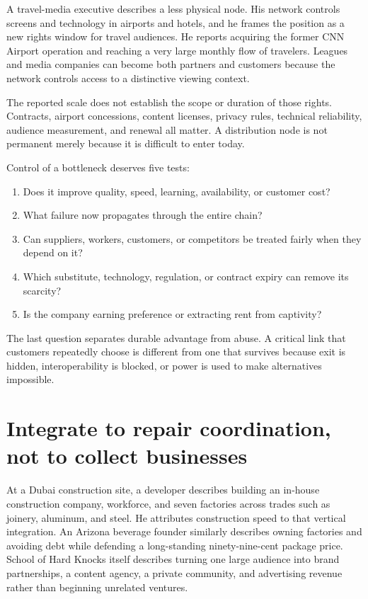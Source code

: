 A travel-media executive describes a less physical node. His network controls
screens and technology in airports and hotels, and he frames the position as a
new rights window for travel audiences. He reports acquiring the former CNN
Airport operation and reaching a very large monthly flow of travelers. Leagues
and media companies can become both partners and customers because the network
controls access to a distinctive viewing context.

The reported scale does not establish the scope or duration of those rights.
Contracts, airport concessions, content licenses, privacy rules, technical
reliability, audience measurement, and renewal all matter. A distribution node
is not permanent merely because it is difficult to enter today.

Control of a bottleneck deserves five tests:

\begin{enumerate}[itemsep=0.15em]
\item Does it improve quality, speed, learning, availability, or customer cost?
\item What failure now propagates through the entire chain?
\item Can suppliers, workers, customers, or competitors be treated fairly when
  they depend on it?
\item Which substitute, technology, regulation, or contract expiry can remove
  its scarcity?
\item Is the company earning preference or extracting rent from captivity?
\end{enumerate}

The last question separates durable advantage from abuse. A critical link that
customers repeatedly choose is different from one that survives because exit
is hidden, interoperability is blocked, or power is used to make alternatives
impossible.

\section{Integrate to repair coordination, not to collect businesses}

At a Dubai construction site, a developer describes building an in-house
construction company, workforce, and seven factories across trades such as
joinery, aluminum, and steel. He attributes construction speed to that vertical
integration. An Arizona beverage founder similarly describes owning factories
and avoiding debt while defending a long-standing ninety-nine-cent package
price. School of Hard Knocks itself describes turning one large audience into
brand partnerships, a content agency, a private community, and advertising
revenue rather than beginning unrelated ventures.

